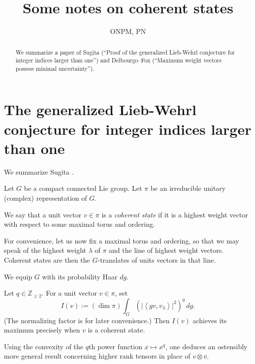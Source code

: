 \documentclass[reqno]{amsart} 
\begin{document}
\author{ONPM, PN}
\title{Some notes on coherent states}


\begin{abstract}
  We summarize a paper of Sugita (``Proof of the generalized Lieb-Wehrl conjecture for integer indices larger than one'') and Delbourgo--Fox (``Maximum weight vectors possess minimal uncertainty'').
\end{abstract}

\maketitle

\section{The generalized Lieb-Wehrl conjecture for integer indices larger than one}\label{sec:cngub4lfbx}
We summarize Sugita \cite{MR1946863}.

Let $G$ be a compact connected Lie group.  Let $\pi$ be an irreducible unitary (complex) representation of $G$.

\begin{definition}\label{definition:cngsx0l9k6}
  We say that a unit vector $v \in \pi$ is a \emph{coherent state} if it is a highest weight vector with respect to some maximal torus and ordering.
\end{definition}

For convenience, let us now fix a maximal torus and ordering, so that we may speak of the highest weight $\lambda$ of $\pi$ and the line of highest weight vectors.  Coherent states are then the $G$-translates of units vectors in that line.

We equip $G$ with its probability Haar $d g$.

\begin{theorem}\label{theorem:cngsx0yg7y}
  Let $q \in \mathbb{Z}_{\geq 2}$.  For a unit vector $v \in \pi$, set
  \begin{equation*}
    I(v) :=
    (\dim \pi)
    \int_{G}
    \left( \lvert \left\langle g v, v_\lambda \right\rangle \rvert^2 \right)^q
    \, d g.
  \end{equation*}
  (The normalizing factor is for later convenience.)  Then $I(v)$ achieves its maximum precisely when $v$ is a coherent state.
\end{theorem}
\begin{remark}\label{remark:cngsx0yf26}
  Using the convexity of the $q$th power function $x \mapsto x^q$, one deduces an ostensibly more general result concerning higher rank tensors in place of $v \otimes \overline{v}$.
\end{remark}
\end{document}

